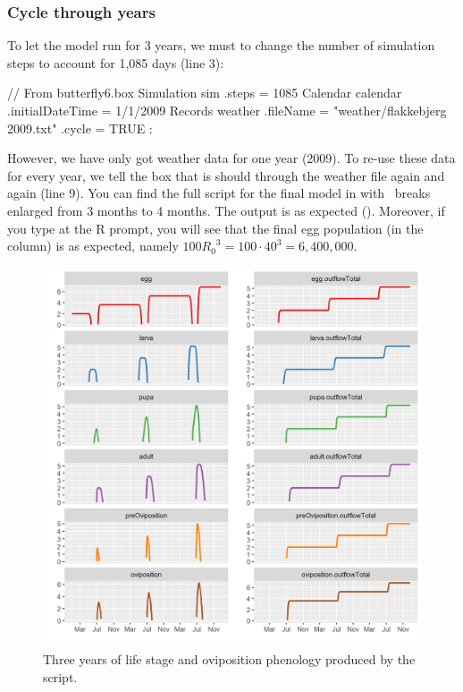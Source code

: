 \subsubsection{Cycle through years}

To let the model run for 3 years, we must to change the number of simulation steps to account for 1,085 days (line 3):

\lstset{numbers=left}
\begin{boxscript}
// From butterfly6.box
Simulation sim {
  .steps = 1085 
  Calendar calendar {
    .initialDateTime = 1/1/2009 
  }
  Records weather {
    .fileName = "weather/flakkebjerg 2009.txt"
    .cycle = TRUE
  }
  :
}
\end{boxscript}
\lstset{numbers=none}

However, we have only got weather data for one year (2009). To re-use these data for every year, we tell the  box that is should  through the weather file again and again (line 9). You can find the full script for the final model in   with \xaxis\ breaks enlarged from 3 months to 4 months. The output is as expected (). Moreover, if you type  at the R prompt, you will see that the final egg population (in the  column) is as expected, namely $100{R_0}^3=100\cdot40^3=6,400,000$.


\begin{figure} [b]
\centering
\includegraphics[width=\textwidth]{graphics/butterfly6}
\caption{Three years of life stage and oviposition phenology produced by the  script.}
\label{fig:butterfly6}
\end{figure}

